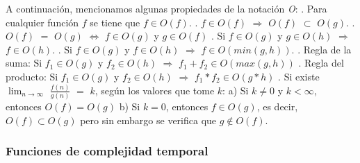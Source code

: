 \documentclass[10pt,a4paper]{article}
\begin{document}
A continuación, mencionamos algunas propiedades de la notación \textit{O}:
\newline
{}. Para cualquier función $f$ se tiene que $f \in O(f)$.
\newline
{}. $f \in O(f)$ $\Rightarrow$ $O(f)$ $\subset$ $O(g)$. 
\newline
{}. $O(f)$ $=$ $O(g)$ $\Leftrightarrow$ $f \in O(g)$ y $g \in O(f)$
\newline
{}. Si $f \in O(g)$ y $g \in O(h)$ $\Rightarrow$ $f \in O(h)$.
\newline
{}. Si $f \in O(g)$ y $f \in O(h)$ $\Rightarrow$ $f \in O(min(g,h))$. 
\newline
{}. Regla de la suma: Si $f_{1} \in O(g)$ y $f_{2} \in O(h)$ $\Rightarrow$ $f_{1} + f_{2} \in O(max(g,h))$   
\newline
{}. Regla del producto: Si $f_{1} \in O(g)$ y $f_{2} \in O(h)$ $\Rightarrow$ $f_{1} * f_{2} \in O(g * h)$ 
\newline
{}. Si existe $\displaystyle \lim_{n \to \infty}$ $\displaystyle \frac{f(n)}{g(n)}$ $=$ $k$, según los valores que tome $k$:
\newline
\newline
a) Si $k \neq 0$ y $k < \infty$, entonces $O(f) = O(g)$  
\newline
\newline
b) Si $k = 0$, entonces $f \in O(g)$, es decir, $O(f) \subset O(g)$ pero sin embargo se verifica que $g \notin O(f)$. 
\newpage 

\subsubsection{Funciones de complejidad temporal}
\end{document}
